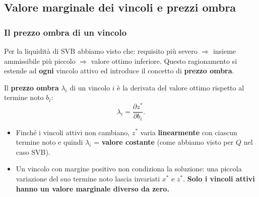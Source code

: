 

\subsection{Valore marginale dei vincoli e prezzi ombra}%

\begin{frame}%
%

\frametitle{Il prezzo ombra di un vincolo}%
%

%


Per la liquidit\`{a} di SVB abbiamo visto che: requisito pi\`{u} severo
$\Rightarrow$ insieme ammissibile pi\`{u} piccolo $\Rightarrow$ valore ottimo
inferiore. Questo ragionamento si estende ad \textbf{ogni} vincolo attivo ed
introduce il concetto di \textbf{prezzo ombra}.

\begin{definition}
[Definizione]Il \textbf{prezzo ombra} $\lambda_{i}$ di un vincolo $i$ \`{e} la
derivata del valore ottimo rispetto al termine noto $b_{i}$:
\[
\lambda_{i}=\frac{\partial z^{\ast}}{\partial b_{i}}.
\]

\end{definition}

\begin{itemize}
\item Finch\'{e} i vincoli attivi non cambiano, $z^{\ast}$ varia
\textbf{linearmente} con ciascun termine noto e quindi $\lambda_{i}$ =
\textbf{valore costante} (come abbiamo visto per $Q$ nel caso SVB).

\item Un vincolo con margine positivo non condiziona la soluzione: una piccola
variazione del suo termine noto lascia invariati $x^{\ast}$ e $z^{\ast}$.
\textbf{Solo i vincoli attivi hanno un valore marginale diverso da zero.}
\end{itemize}

%

\transboxout
\end{frame}%


